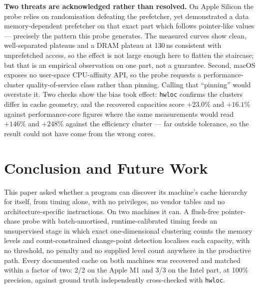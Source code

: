 \documentclass[conference]{IEEEtran}
\begin{document}
\textbf{Two threats are acknowledged rather than resolved.} On Apple Silicon the
probe relies on randomisation defeating the prefetcher, yet
\citet{vicarte2022} demonstrated a data memory-dependent prefetcher on that exact
part which follows pointer-like values --- precisely the pattern this probe
generates. The measured curves show clean, well-separated plateaus and a DRAM
plateau at 130\,ns consistent with unprefetched access, so the effect is not large
enough here to flatten the staircase; but that is an empirical observation on one
part, not a guarantee. Second, macOS exposes no user-space CPU-affinity API, so
the probe requests a performance-cluster quality-of-service class rather than
pinning. Calling that ``pinning'' would overstate it. Two checks show the bias
took effect: \texttt{hwloc} confirms the clusters differ in cache geometry, and
the recovered capacities score $+23.0\%$ and $+16.1\%$ against performance-core
figures where the same measurements would read $+146\%$ and $+248\%$ against the
efficiency cluster --- far outside tolerance, so the result could not have come
from the wrong cores.

\section{Conclusion and Future Work}
\label{sec:conclusion}

This paper asked whether a program can discover its machine's cache hierarchy for
itself, from timing alone, with no privileges, no vendor tables and no
architecture-specific instructions. On two machines it can. A flush-free
pointer-chase probe with batch-amortised, runtime-calibrated timing feeds an
unsupervised stage in which exact one-dimensional clustering counts the memory
levels and count-constrained change-point detection localises each capacity, with
no threshold, no penalty and no supplied level count anywhere in the productive
path. Every documented cache on both machines was recovered and matched within a
factor of two: 2/2 on the Apple M1 and 3/3 on the Intel part, at 100\% precision,
against ground truth independently cross-checked with \texttt{hwloc}.
\end{document}
